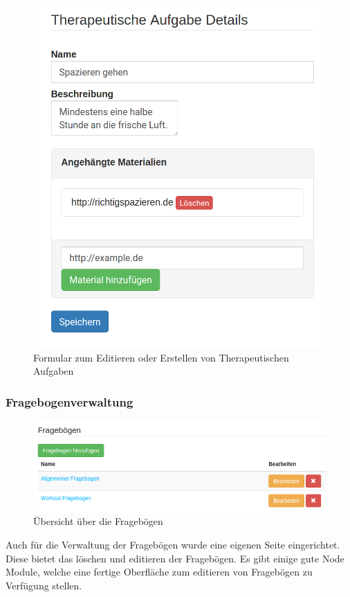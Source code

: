 \begin{figure}[H]
	\centering
	\includegraphics[scale=0.25]{images/Screenshots/TherapeutischeAufgabeDetail}
	\caption[Formular zum Editieren oder Erstellen von Therapeutischen Aufgaben]{Formular zum Editieren oder Erstellen von Therapeutischen Aufgaben}
	\label{TherapeutischeAufgabeDetail}
\end{figure}


\subsubsection{Fragebogenverwaltung}
\begin{figure}
	\centering
	\includegraphics[scale=0.4]{images/Screenshots/FragebogenUebersicht}
	\caption[Übersicht über die Fragebögen]{Übersicht über die Fragebögen}
	\label{FragebogenUebersicht}
\end{figure}
Auch für die Verwaltung der Fragebögen wurde eine eigenen Seite eingerichtet. Diese bietet das löschen und editieren der Fragebögen. Es gibt einige gute Node Module, welche eine fertige Oberfläche zum editieren von Fragebögen zu Verfügung stellen.

